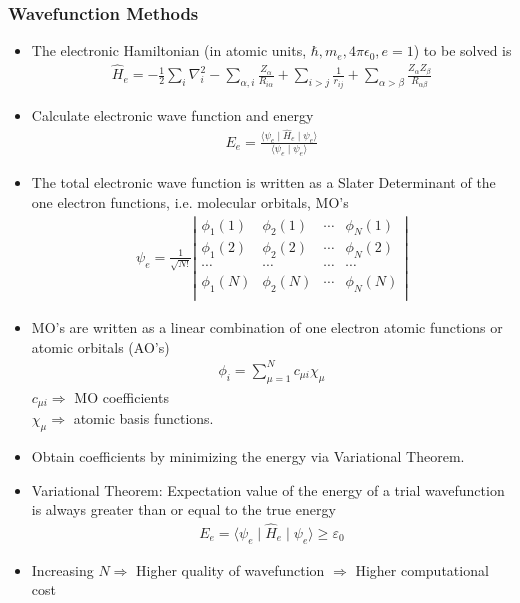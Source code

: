 \documentclass[slidestop,mathserif,compress,xcolor=svgnames]{beamer}
\begin{document}
\begin{frame}
\frametitle{\small Wavefunction Methods}
\footnotesize{
\begin{itemize}
\item The electronic Hamiltonian (in atomic units, $\hbar,m_e,4\pi\epsilon_0,e=1$) to be solved is 
\begin{align*}
\hat{H}_e = -\frac{1}{2}\sum_i\nabla^2_i - \sum_{\alpha,i}\frac{Z_\alpha}{R_{i\alpha}} + \sum_{i>j}\frac{1}{r_{ij}} + \sum_{\alpha>\beta}\frac{Z_\alpha Z_\beta}{R_{\alpha\beta}}
\end{align*}
\item Calculate electronic wave function and energy
\begin{align*}
E_e = \frac{\langle\psi_e\mid\hat{H}_e\mid\psi_e\rangle}{\langle\psi_e\mid\psi_e\rangle}
\end{align*}
\item The total electronic wave function is written as a Slater Determinant of the one electron functions, i.e. molecular orbitals, MO's
\begin{align*}
\psi_e = \frac{1}{\sqrt{N!}}\left| \begin{array}{cccc}
\phi_1(1) & \phi_2(1) & \cdots & \phi_N(1)\\
\phi_1(2) & \phi_2(2) & \cdots & \phi_N(2)\\
\cdots & \cdots & \cdots & \cdots \\
\phi_1(N) & \phi_2(N) & \cdots & \phi_N(N)\\
\end{array} \right|
\end{align*}
\end{itemize}
}
\end{frame}

\begin{frame}
\footnotesize{
\begin{itemize}
\item MO's are written as a linear combination of one electron atomic functions or atomic orbitals (AO's)
\begin{align*}
\phi_i = \sum^N_{\mu=1}c_{\mu i}\chi_\mu
\end{align*}
$c_{\mu i} \Rightarrow$ MO coefficients\\
$\chi_\mu\Rightarrow$ atomic basis functions.
\item Obtain coefficients by minimizing the energy via Variational Theorem.
\item Variational Theorem: Expectation value of the energy of a trial wavefunction is always greater than or equal to the true energy
\begin{align*}
E_e = \langle\psi_e\mid\hat{H}_e\mid\psi_e\rangle \ge \varepsilon_0
\end{align*}
\item Increasing $N \Rightarrow$ Higher quality of wavefunction $\Rightarrow$ Higher computational cost
\end{itemize}
}
\end{frame}
\end{document}
